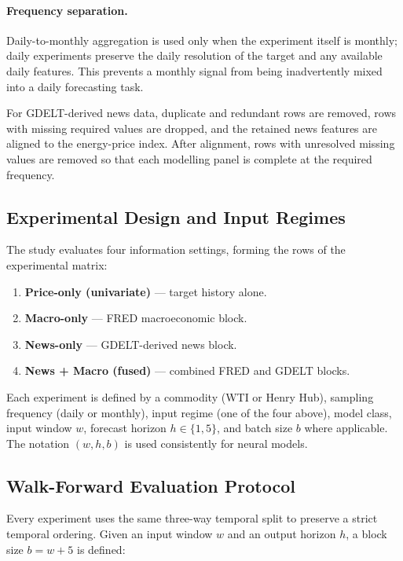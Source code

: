 \documentclass[12pt,a4paper]{article}
\begin{document}
\paragraph{Frequency separation.} Daily-to-monthly aggregation is used only when the experiment itself is monthly; daily experiments preserve the daily resolution of the target and any available daily features. This prevents a monthly signal from being inadvertently mixed into a daily forecasting task.

For GDELT-derived news data, duplicate and redundant rows are removed, rows with missing required values are dropped, and the retained news features are aligned to the energy-price index. After alignment, rows with unresolved missing values are removed so that each modelling panel is complete at the required frequency.

\subsection{Experimental Design and Input Regimes}

The study evaluates four information settings, forming the rows of the experimental matrix:

\begin{enumerate}[leftmargin=*]
  \item \textbf{Price-only (univariate)} — target history alone.
  \item \textbf{Macro-only} — FRED macroeconomic block.
  \item \textbf{News-only} — GDELT-derived news block.
  \item \textbf{News + Macro (fused)} — combined FRED and GDELT blocks.
\end{enumerate}

Each experiment is defined by a commodity (WTI or Henry Hub), sampling frequency (daily or monthly), input regime (one of the four above), model class, input window $w$, forecast horizon $h \in \{1, 5\}$, and batch size $b$ where applicable. The notation $(w, h, b)$ is used consistently for neural models.

\subsection{Walk-Forward Evaluation Protocol}\label{sec:protocol}

Every experiment uses the same three-way temporal split to preserve a strict temporal ordering. Given an input window $w$ and an output horizon $h$, a block size $b = w + 5$ is defined:
\end{document}
